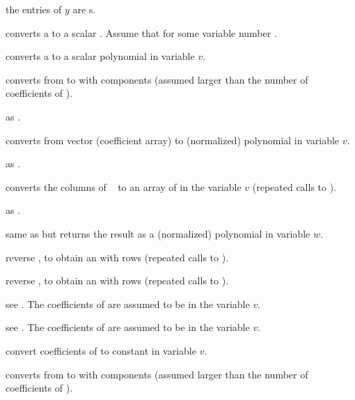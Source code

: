  the entries of $y$ are s.


 converts a  to a
scalar . Assume that  for some variable
number .

 converts a  to a scalar
polynomial in variable $v$.

 converts from  to 
with  components (assumed larger than the number of coefficients of
).

 as .

 converts from vector (coefficient
array) to (normalized) polynomial in variable $v$.

 as .

 converts the columns of
~ to an array of  in the variable $v$
(repeated calls to ).

 as .

 same as
 but returns the result as a (normalized) polynomial
in variable $w$.

 reverse , to obtain
an  with  rows (repeated calls to ).

 reverse , to obtain
an  with  rows (repeated calls to ).

 see .
The coefficients of  are assumed to be in the variable $v$.

 see .
The coefficients of  are assumed to be in the variable $v$.

 convert coefficients of  to
constant  in variable $v$.


 converts from  to 
with  components (assumed larger than the number of coefficients of
).

